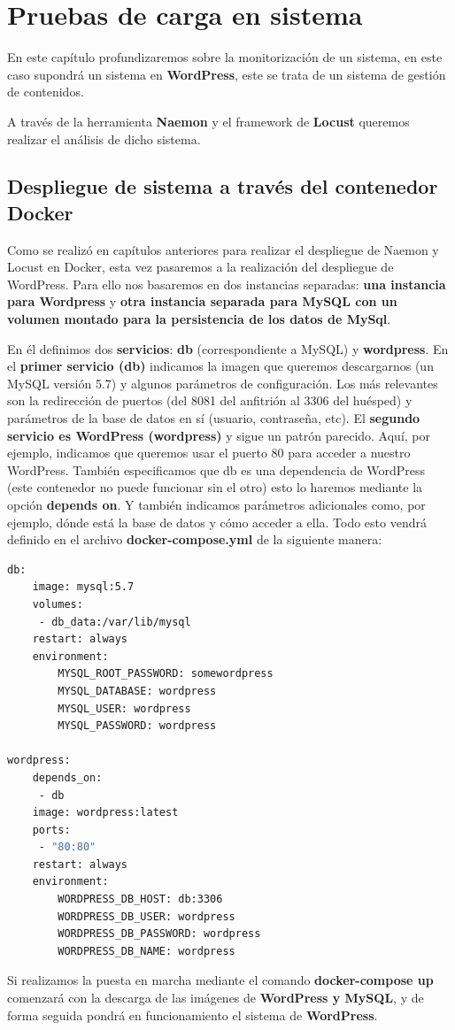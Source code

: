 \chapter{Pruebas de carga en sistema} \label{ch:carga_cliente}

En este capítulo profundizaremos sobre la monitorización de un sistema, en este caso supondrá un sistema en \textbf{WordPress}, este se trata de un sistema de gestión de contenidos.

A través de la herramienta \textbf{Naemon} y el framework de \textbf{Locust} queremos realizar el análisis de dicho sistema.
\section{Despliegue de sistema a través del contenedor Docker}
Como se realizó en capítulos anteriores para realizar el despliegue de Naemon y Locust en Docker, esta vez pasaremos a la realización del despliegue de WordPress. Para ello nos basaremos en dos instancias separadas: \textbf{una instancia para Wordpress} y \textbf{otra instancia separada para MySQL con un volumen montado para la persistencia de los datos de MySql}.

En él definimos dos \textbf{servicios}: \textbf{db} (correspondiente a MySQL) y \textbf{wordpress}. En el \textbf{primer servicio (db)} indicamos la imagen que queremos descargarnos (un MySQL versión 5.7) y algunos parámetros de configuración. Los más relevantes son la redirección de puertos (del 8081 del anfitrión al 3306 del huésped) y parámetros de la base de datos en sí (usuario, contraseña, etc).
\newpage
El \textbf{segundo servicio es WordPress (wordpress)} y sigue un patrón parecido. Aquí, por ejemplo, indicamos que queremos usar el puerto 80 para acceder a nuestro WordPress. También especificamos que db es una dependencia de WordPress (este contenedor no puede funcionar sin el otro) esto lo haremos mediante la opción \textbf{depends on}. Y también indicamos parámetros adicionales como, por ejemplo, dónde está la base de datos y cómo acceder a ella. Todo esto vendrá definido en el archivo \textbf{docker-compose.yml} de la siguiente manera:
\begin{lstlisting}[language=bash]
db:
	image: mysql:5.7
	volumes:
	 - db_data:/var/lib/mysql
	restart: always
	environment:
		MYSQL_ROOT_PASSWORD: somewordpress
		MYSQL_DATABASE: wordpress
		MYSQL_USER: wordpress
		MYSQL_PASSWORD: wordpress

wordpress:
	depends_on:
	 - db
	image: wordpress:latest
	ports:
	 - "80:80"
	restart: always
	environment:
		WORDPRESS_DB_HOST: db:3306
		WORDPRESS_DB_USER: wordpress
		WORDPRESS_DB_PASSWORD: wordpress
		WORDPRESS_DB_NAME: wordpress
\end{lstlisting}
Si realizamos la puesta en marcha mediante el comando \textbf{docker-compose up} comenzará con la descarga de las imágenes de \textbf{WordPress y MySQL}, y de forma seguida pondrá en funcionamiento el sistema de \textbf{WordPress}.


